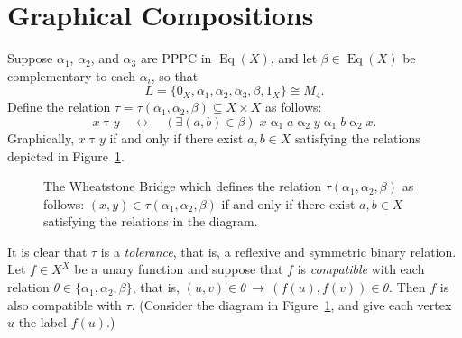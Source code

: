\documentclass{amsart}
\theoremstyle{plain}
\theoremstyle{definition}
\theoremstyle{definition}
\numberwithin{equation}{section}
\newcommand{\<}{\ensuremath{\langle}}
\renewcommand{\>}{\ensuremath{\rangle}}
\newcommand{\Eq}{\ensuremath{\operatorname{Eq}}}
\newcommand{\ralpha}{\ensuremath{\mathrel{\alpha}}}
\newcommand{\rtau}{\ensuremath{\mathrel{\tau}}}
\begin{document}
\section{Graphical Compositions}
Suppose $\alpha_1$, $\alpha_2$, and $\alpha_3$ are \ac{PPPC} in $\Eq(X)$, and
let $\beta\in \Eq(X)$ be complementary to 
each 
$\alpha_i$, so that 
\[
L = \{0_X, \alpha_1, \alpha_2, \alpha_3, \beta, 1_X\} \cong M_4.
\]  
Define the relation $\tau=\tau(\alpha_1, \alpha_2, \beta)\subseteq X\times X$ as
follows:
\[
x \rtau y \quad \longleftrightarrow \quad (\exists (a, b) \in \beta)\;  
x \ralpha_1 a \ralpha_2 y \ralpha_1 b \ralpha_2 x.
\]
Graphically, $x \mathrel{\tau} y$ if and only if there exist $a, b \in X$
satisfying the relations depicted in Figure~\ref{fig:rho}.

\newcommand\dotsize{1pt}
\begin{figure}
  \caption{The Wheatstone Bridge which defines the relation 
    $\tau(\alpha_1, \alpha_2, \beta)$ as follows: 
    $(x,y) \in \tau(\alpha_1, \alpha_2, \beta)$ if and only if there 
    exist $a, b \in X$ satisfying the relations in the diagram.}
  \label{fig:rho}
\end{figure}

It is clear that $\tau$ is a \emph{tolerance}, that is, a reflexive and symmetric binary relation.
Let $f\in X^X$ be a unary function and suppose that $f$ is \emph{compatible} with each
relation $\theta \in \{\alpha_1, \alpha_2, \beta\}$, that is, 
$(u,v)\in \theta \, \longrightarrow \, (f(u), f(v))\in \theta$.  Then $f$ is also
compatible with $\tau$. (Consider the diagram in Figure~\ref{fig:rho}, and give
each vertex $u$ the label $f(u)$.)
\end{document}
